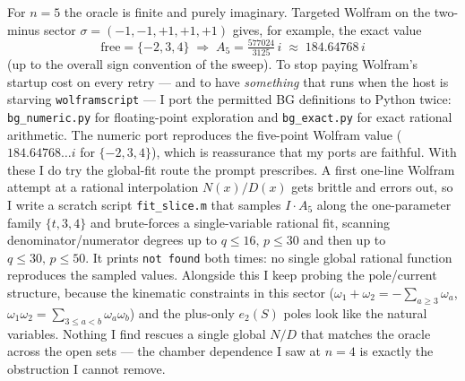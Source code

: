 \documentclass{article}
\begin{document}
For $n=5$ the oracle is finite and purely imaginary. Targeted Wolfram on the
two-minus sector $\sigma=(-1,-1,+1,+1,+1)$ gives, for example, the exact value
\[
\text{free}=\{-2,3,4\}\;\Rightarrow\; A_5=\tfrac{577024}{3125}\,i
\;\approx\; 184.64768\,i
\]
(up to the overall sign convention of the sweep). To stop paying Wolfram's
startup cost on every retry --- and to have \emph{something} that runs when the
host is starving \texttt{wolframscript} --- I port the permitted BG definitions
to Python twice: \texttt{bg\_numeric.py} for floating-point exploration and
\texttt{bg\_exact.py} for exact rational arithmetic. The numeric port
reproduces the five-point Wolfram value ($184.64768\dots i$ for $\{-2,3,4\}$),
which is reassurance that my ports are faithful. With these I do try the
global-fit route the prompt prescribes. A first one-line Wolfram attempt at a
rational interpolation $N(x)/D(x)$ gets brittle and errors out, so I write a
scratch script \texttt{fit\_slice.m} that samples $I\cdot A_5$ along the
one-parameter family $\{t,3,4\}$ and brute-forces a single-variable
rational fit, scanning denominator/numerator degrees up to $q\le16,\,p\le30$
and then up to $q\le30,\,p\le50$. It prints \texttt{not found} both times: no
single global rational function reproduces the sampled values. Alongside this I
keep probing the pole/current structure, because the kinematic constraints in
this sector ($\omega_1+\omega_2=-\sum_{a\ge3}\omega_a$,
$\omega_1\omega_2=\sum_{3\le a<b}\omega_a\omega_b$) and the plus-only $e_2(S)$
poles look like the natural variables. Nothing I find rescues a single global
$N/D$ that matches the oracle across the open sets --- the chamber dependence I
saw at $n=4$ is exactly the obstruction I cannot remove.
\end{document}
